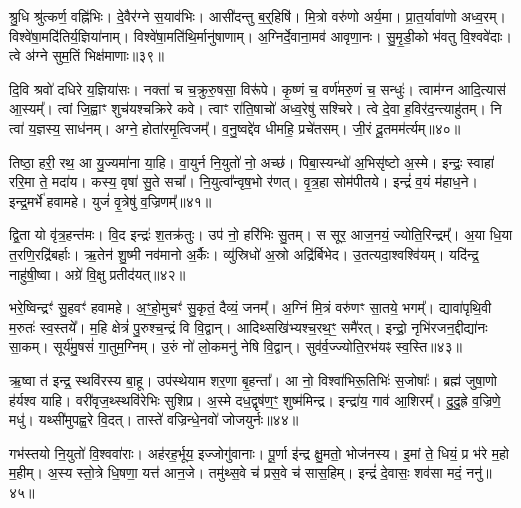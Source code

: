 श्रु॒धि श्रु॑त्कर्ण॒ वह्नि॑भिः।
दे॒वैर॑ग्ने स॒याव॑भिः।
आसी॑दन्तु ब॒र्॒हिषि॑।
मि॒त्रो वरु॑णो अर्य॒मा।
प्रा॒त॒र्यावा॑णो अध्व॒रम्।
विश्वे॑षा॒मदि॑तिर्य॒ज्ञिया॑नाम्।
विश्वे॑षा॒मति॑थि॒र्मानु॑षाणाम्।
अ॒ग्निर्दे॒वाना॒\-मव॑ आवृणा॒नः।
सु॒मृ॒डी॒को भ॑वतु वि॒श्ववे॑दाः।
त्वे अ॑ग्ने सुम॒तिं भिक्ष॑माणाः॥३९॥\ip

दि॒वि श्रवो॑ दधिरे य॒ज्ञिया॑सः।
नक्ता॑ च च॒क्रुरु॒षसा॒ विरू॑पे।
कृ॒ष्णं च॒ वर्ण॑मरु॒णं च॒ सन्धुः॑।
त्वाम॑ग्न आदि॒त्यास॑ आ॒स्यम्᳚।
त्वां जि॒ह्वाꣳ शुच॑यश्चक्रिरे कवे।
त्वाꣳ रा॑ति॒षाचो॑ अध्व॒रेषु॑ सश्चिरे।
त्वे दे॒वा ह॒विर॑द॒न्त्याहु॑तम्।
नि त्वा॑ य॒ज्ञस्य॒ साध॑नम्।
अग्ने॒ होता॑रमृ॒त्विजम्᳚।
व॒नु॒ष्वद्दे॑व धीमहि॒ प्रचे॑तसम्।
जी॒रं दू॒तमम॑र्त्यम्॥४०॥\ip\anuvakamend[य॒ज्ञ॒वा॒ह॒सा॒स॒प॒र्य॒न्व॒यमृ॑द्ध्यां॒ भिक्ष॑माणाः॒ प्रचे॑तस॒मेकं॑ च]

तिष्ठा॒ हरी॒ रथ॒ आ यु॒ज्यमा॑ना या॒हि।
वा॒युर्न नि॒युतो॑ नो॒ अच्छ॑।
पिबा॒स्यन्धो॑ अ॒भिसृ॑ष्टो अ॒स्मे।
इन्द्रः॒ स्वाहा॑ ररि॒मा ते॒ मदा॑य।
कस्य॒ वृषा॑ सु॒ते सचा᳚।
नि॒युत्वा᳚न्वृष॒भो र॑णत्।
वृ॒त्र॒हा सोम॑पीतये।
इन्द्रं॑ व॒यं म॑हाध॒ने।
इन्द्र॒मर्भे॑ हवामहे।
युजं॑ वृ॒त्रेषु॑ व॒ज्रिणम्᳚॥४१॥\ip

द्वि॒ता यो वृ॑त्र॒हन्त॑मः।
वि॒द इन्द्रः॑ श॒तक्र॑तुः।
उप॑ नो॒ हरि॑भिः सु॒तम्।
स सूर॒ आज॒नयं॒ ज्योति॒रिन्द्रम्᳚।
अ॒या धि॒या त॒रणि॒रद्रि॑बर्\mbox{}हाः।
ऋ॒तेन॑ शु॒ष्मी नव॑मानो अ॒र्कैः।
व्यु॑स्रिधो॑ अ॒स्रो अद्रि॑र्बिभेद।
उ॒तत्यदा॒श्वश्वि॑यम्।
यदि॑न्द्र॒ नाहु॑षी॒ष्वा।
अग्रे॑ वि॒क्षु प्रतीद॑यत्॥४२॥\ip

भरे॒ष्विन्द्रꣳ॑ सु॒हवꣳ॑ हवामहे।
अ॒ꣳ॒हो॒मुचꣳ॑ सु॒कृतं॒ दैव्यं॒ जनम्᳚।
अ॒ग्निं मि॒त्रं वरु॑णꣳ सा॒तये॒ भगम्᳚।
द्यावा॑पृथि॒वी म॒रुतः॑ स्व॒स्तये᳚।
म॒हि क्षेत्रं॑ पु॒रुश्च॒न्द्रं वि वि॒द्वान्।
आदिथ्सखि॑भ्यश्च॒रथ॒ꣳ॒ समै॑रत्।
इन्द्रो॒ नृभि॑रजन॒द्दीद्या॑नः सा॒कम्।
सूर्य॑मु॒षसं॑ गा॒तुम॒ग्निम्।
उ॒रुं नो॑ लो॒कमनु॑ नेषि वि॒द्वान्।
सुव॑र्व॒ज्ज्योति॒रभ॑यꣴ स्व॒स्ति॥४३॥\ip

ऋ॒ष्वा त॑ इन्द्र॒ स्थवि॑रस्य बा॒हू।
उप॑स्थेयाम शर॒णा बृ॒हन्ता᳚।
आ नो॒ विश्वा॑भिरू॒तिभिः॑ स॒जोषाः᳚।
ब्रह्म॑ जुषा॒णो ह॑र्यश्व याहि।
वरी॑वृज॒थ्स्थवि॑रेभिः सुशिप्र।
अ॒स्मे दध॒द्वृष॑ण॒ꣳ॒ शुष्म॑मिन्द्र।
इन्द्रा॑य॒ गाव॑ आ॒शिरम्᳚।
दु॒दु॒ह्रे व॒ज्रिणे॒ मधु॑।
यथ्सी॑मुपह्व॒रे वि॒दत्।
तास्ते॑ वज्रिन्धे॒नवो॑ जोजयुर्नः॥४४॥\ip

गभ॑स्तयो नि॒युतो॑ वि॒श्ववा॑राः।
अह॑रह॒र्भूय॒ इज्जोगु॑वानाः।
पू॒र्णा इ॑न्द्र क्षु॒मतो॒ भोज॑नस्य।
इ॒मां ते॒ धियं॒ प्र भ॑रे म॒हो म॒हीम्।
अ॒स्य स्तो॒त्रे धि॒षणा॒ यत्त॑ आन॒जे।
तमु॑थ्स॒वे च॑ प्रस॒वे च॑ सास॒हिम्।
इन्द्रं॑ दे॒वासः॒ शव॑सा मदं॒ ननु॑॥४५॥\ip\anuvakamend[व॒ज्रिण॑मयथ्स्व॒स्ति जो॑जयुर्नः स॒प्त च॑]

